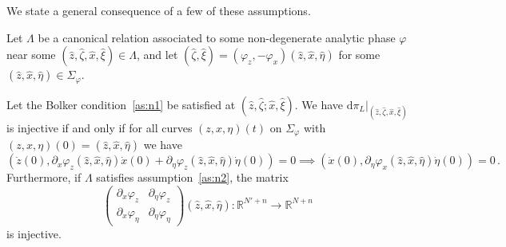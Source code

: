 \documentclass[
	fontsize=11pt, 
	twoside=false, 
	abstract=true, 
	a4paper,
]{scrartcl}
\newcommand{\RR}{\mathbb{R}}
\newcommand{\dd}{\mathrm{d}}
\newcommand{\abs}[1]{\left\lvert#1\right\rvert}
\newcommand{\del}{\partial}
\begin{document}
We state a general consequence of a few of these assumptions.
\begin{lemma}
	Let $\Lambda$ be a canonical relation associated to some non-degenerate analytic phase $\varphi$ near some $(\hat z, \hat \zeta, \hat x, \hat \xi) \in \Lambda$, and let $(\hat \zeta,\hat \xi) = (\varphi_z,-\varphi_x)(\hat z, \hat x, \hat \eta)$ for some $(\hat z, \hat x, \hat \eta) \in \Sigma_\varphi$.

	Let the Bolker condition~\ref{as:n1} be satisfied at $(\hat z,\hat \zeta;\hat x,\hat\xi)$. We have $\dd\pi_L\vert_{(\hat z, \hat \zeta, \hat x, \hat \xi)}$ is injective if and only if for all curves $(z,x,\eta)(t)$ on $\Sigma_\varphi$ with $(z,x,\eta)(0) = (\hat z, \hat x, \hat \eta)$ we have
\begin{equation}\label{eq:injmatrix}
(\dot z(0), \del_x\varphi_{z}(\hat z, \hat x, \hat \eta)\dot x(0) +  \del_\eta\varphi_{z}(\hat z, \hat x, \hat \eta)\dot\eta(0)) = 0 \implies (\dot x(0), \del_\eta\varphi_{x}(\hat z, \hat x, \hat \eta)\dot\eta(0)) = 0\,.
\end{equation}
Furthermore, if $\Lambda$ satisfies assumption~\ref{as:n2}, 
	the matrix
	\begin{equation}\label{eq:fullyinvmat}
		\begin{pmatrix}
			\del_x\varphi_z & \del_\eta\varphi_z \\
			\del_x\varphi_\eta & \del_\eta\varphi_\eta
		\end{pmatrix}(\hat z,\hat x,\hat\eta) \colon \RR^{N'+n} \to \RR^{N+n}
	\end{equation}
	is injective.
\end{lemma}
\end{document}
